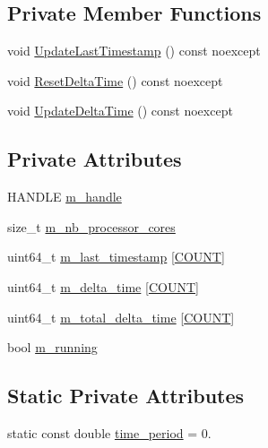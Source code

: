 \subsection*{Private Member Functions}
\begin{DoxyCompactItemize}
\item 
void \hyperlink{classmage_1_1_c_p_u_timer_aa956ede1a12c0c383e7fcc53e6f8c405}{Update\+Last\+Timestamp} () const noexcept
\item 
void \hyperlink{classmage_1_1_c_p_u_timer_acb1a264ae09cea3d96794e3c0af246e7}{Reset\+Delta\+Time} () const noexcept
\item 
void \hyperlink{classmage_1_1_c_p_u_timer_a4e82f7003a11e109495b7450e2f82f4f}{Update\+Delta\+Time} () const noexcept
\end{DoxyCompactItemize}
\subsection*{Private Attributes}
\begin{DoxyCompactItemize}
\item 
H\+A\+N\+D\+LE \hyperlink{classmage_1_1_c_p_u_timer_a95b8ac18c050ed25293c8a923087369a}{m\+\_\+handle}
\item 
size\+\_\+t \hyperlink{classmage_1_1_c_p_u_timer_ac5fdb38a70c74815231b5efd8d746be1}{m\+\_\+nb\+\_\+processor\+\_\+cores}
\item 
uint64\+\_\+t \hyperlink{classmage_1_1_c_p_u_timer_a1334979cc0c39a8aa667f289f90fb78d}{m\+\_\+last\+\_\+timestamp} \mbox{[}\hyperlink{classmage_1_1_c_p_u_timer_a95a81bb0f32d2cc9881f311a0f6fa895a780a9a1245e4e551833ba02eb606bdf8}{C\+O\+U\+NT}\mbox{]}
\item 
uint64\+\_\+t \hyperlink{classmage_1_1_c_p_u_timer_a764d94b0a2392cbb98bd675f547f671d}{m\+\_\+delta\+\_\+time} \mbox{[}\hyperlink{classmage_1_1_c_p_u_timer_a95a81bb0f32d2cc9881f311a0f6fa895a780a9a1245e4e551833ba02eb606bdf8}{C\+O\+U\+NT}\mbox{]}
\item 
uint64\+\_\+t \hyperlink{classmage_1_1_c_p_u_timer_aaf482aacb1af55dd559a1d08de104697}{m\+\_\+total\+\_\+delta\+\_\+time} \mbox{[}\hyperlink{classmage_1_1_c_p_u_timer_a95a81bb0f32d2cc9881f311a0f6fa895a780a9a1245e4e551833ba02eb606bdf8}{C\+O\+U\+NT}\mbox{]}
\item 
bool \hyperlink{classmage_1_1_c_p_u_timer_a7190afa453085b7bbd7cb76ff6bb62f2}{m\+\_\+running}
\end{DoxyCompactItemize}
\subsection*{Static Private Attributes}
\begin{DoxyCompactItemize}
\item 
static const double \hyperlink{classmage_1_1_c_p_u_timer_a9ff7683150a07f2040b660fc3775337b}{time\+\_\+period} = 0.
\end{DoxyCompactItemize}


